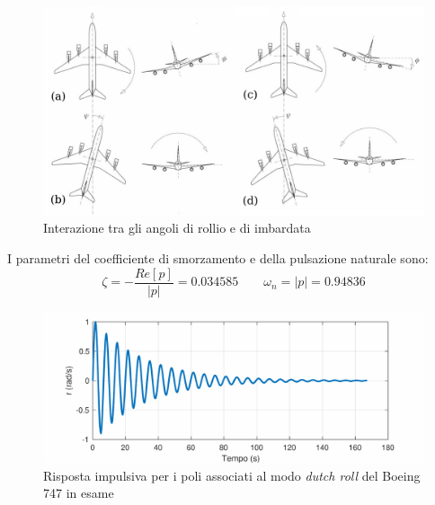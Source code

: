 \begin{figure}[H]
    \centering
    \includegraphics[width=0.8\linewidth]{Immagini/dutch_roll_physics.jpg}
    \caption{Interazione tra gli angoli di rollio e di imbardata \cite{cook1997flight}}
\end{figure}

I parametri del coefficiente di smorzamento e della pulsazione naturale sono:
\begin{equation*}
    \zeta = - \frac{Re[p]}{\left|p\right|} = 0.034585 \qquad \omega_n = \left|p\right| = 0.94836
\end{equation*}

\begin{figure}[H]
    \centering
    \includegraphics[width=0.7\linewidth]{Immagini/dutch_roll_mode.pdf}
    \caption{Risposta impulsiva per i poli associati al modo \textit{dutch roll} del Boeing 747 in esame}
\end{figure}
